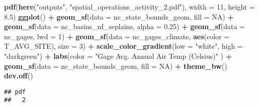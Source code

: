 \documentclass[]{article}
\newenvironment{Shaded}{\begin{snugshade}}{\end{snugshade}}
\newcommand{\KeywordTok}[1]{\textcolor[rgb]{0.13,0.29,0.53}{\textbf{#1}}}
\newcommand{\DataTypeTok}[1]{\textcolor[rgb]{0.13,0.29,0.53}{#1}}
\newcommand{\DecValTok}[1]{\textcolor[rgb]{0.00,0.00,0.81}{#1}}
\newcommand{\FloatTok}[1]{\textcolor[rgb]{0.00,0.00,0.81}{#1}}
\newcommand{\StringTok}[1]{\textcolor[rgb]{0.31,0.60,0.02}{#1}}
\newcommand{\OtherTok}[1]{\textcolor[rgb]{0.56,0.35,0.01}{#1}}
\newcommand{\OperatorTok}[1]{\textcolor[rgb]{0.81,0.36,0.00}{\textbf{#1}}}
\newcommand{\NormalTok}[1]{#1}
\begin{document}
\begin{Shaded}
\begin{Highlighting}[]
\KeywordTok{pdf}\NormalTok{(}\KeywordTok{here}\NormalTok{(}\StringTok{"outputs"}\NormalTok{, }\StringTok{"spatial_operations_activity_2.pdf"}\NormalTok{), }\DataTypeTok{width =} \DecValTok{11}\NormalTok{, }\DataTypeTok{height =} \FloatTok{8.5}\NormalTok{) }
\KeywordTok{ggplot}\NormalTok{() }\OperatorTok{+}
\StringTok{  }\KeywordTok{geom_sf}\NormalTok{(}\DataTypeTok{data =}\NormalTok{ nc_state_bounds_geom, }\DataTypeTok{fill =} \OtherTok{NA}\NormalTok{) }\OperatorTok{+}
\StringTok{  }\KeywordTok{geom_sf}\NormalTok{(}\DataTypeTok{data =}\NormalTok{ nc_basins_nf_seplains, }\DataTypeTok{alpha =} \FloatTok{0.25}\NormalTok{) }\OperatorTok{+}
\StringTok{  }\KeywordTok{geom_sf}\NormalTok{(}\DataTypeTok{data =}\NormalTok{ nc_gages, }\DataTypeTok{lwd =} \DecValTok{1}\NormalTok{) }\OperatorTok{+}
\StringTok{  }\KeywordTok{geom_sf}\NormalTok{(}\DataTypeTok{data =}\NormalTok{ nc_gages_climate, }\KeywordTok{aes}\NormalTok{(}\DataTypeTok{color =}\NormalTok{ T_AVG_SITE), }\DataTypeTok{size =} \DecValTok{3}\NormalTok{) }\OperatorTok{+}
\StringTok{  }\KeywordTok{scale_color_gradient}\NormalTok{(}\DataTypeTok{low =} \StringTok{"white"}\NormalTok{, }\DataTypeTok{high =} \StringTok{"darkgreen"}\NormalTok{) }\OperatorTok{+}
\StringTok{  }\KeywordTok{labs}\NormalTok{(}\DataTypeTok{color =} \StringTok{"Gage Avg. Annual Air Temp (Celsius)"}\NormalTok{ ) }\OperatorTok{+}
\StringTok{  }\KeywordTok{geom_sf}\NormalTok{(}\DataTypeTok{data =}\NormalTok{ nc_state_bounds_geom, }\DataTypeTok{fill =} \OtherTok{NA}\NormalTok{) }\OperatorTok{+}
\StringTok{  }\KeywordTok{theme_bw}\NormalTok{()}
\KeywordTok{dev.off}\NormalTok{()}
\end{Highlighting}
\end{Shaded}

\begin{verbatim}
## pdf 
##   2
\end{verbatim}
\end{document}
